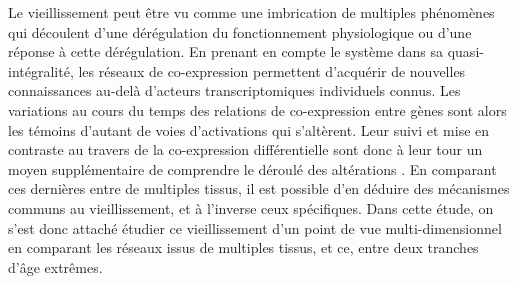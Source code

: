 Le vieillissement peut être vu comme une imbrication de multiples phénomènes qui découlent d'une dérégulation du fonctionnement physiologique ou d'une réponse à cette dérégulation. En prenant en compte le système dans sa quasi-intégralité, les réseaux de co-expression permettent d'acquérir de nouvelles connaissances au-delà d'acteurs transcriptomiques individuels connus. Les variations au cours du temps des relations de co-expression entre gènes sont alors les témoins d'autant de voies d'activations qui s'altèrent. Leur suivi et mise en contraste au travers de la co-expression différentielle sont donc à leur tour un moyen supplémentaire de comprendre le déroulé des altérations \cite{Sharan2006, Southworth2009}. En comparant ces dernières entre de multiples tissus, il est possible d'en déduire des mécanismes communs au vieillissement, et à l'inverse ceux spécifiques. Dans cette étude, on s'est donc attaché étudier ce vieillissement d'un point de vue multi-dimensionnel en comparant les réseaux issus de multiples tissus, et ce, entre deux tranches d'âge extrêmes. 

